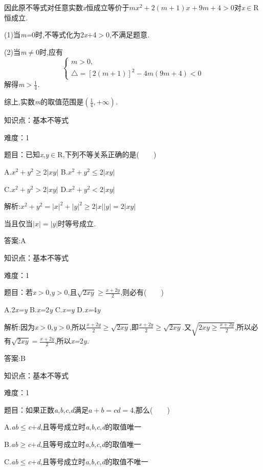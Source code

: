\documentclass{article} %
\begin{document}
因此原不等式对任意实数\textit{x}恒成立等价于$mx^2+2(m+1)x+9m+4>0$对\textit{x}$\mathrm{\in}$R恒成立\textit{.}

(1)当\textit{m=}0时,不等式化为2\textit{x$+$}4\textit{$>$}0,不满足题意\textit{.}

(2)当\textit{m}$\mathrm{\neq}$0时,应有
\[
\begin{cases}
m>0,\\
\bigtriangleup = {[2(m+1)]}^2-4m(9m+4)<0
\end{cases}
\]
解得\textit{m$>\frac{1}{4}$}\textit{.}

综上,实数\textit{m}的取值范围是$(\frac{1}{4},+\infty)$\textit{.}


知识点：基本不等式

难度：1

 题目：已知\textit{x},\textit{y}$\mathrm{\in}$R,下列不等关系正确的是(\textit{　　})

 

 A.$x^2+y^2 \ge 2 |xy|$ B.$x^2+y^2 \le 2 |xy|$

 C.$x^2+y^2 > 2 |xy|$ D.$x^2+y^2 < 2 |xy|$

 解析:$x^2+y^2={|x|}^2+{|y|}^2 \ge 2 |x||y|=2|xy|$

当且仅当$|x|=|y|$时等号成立\textit{.}

 答案:A

知识点：基本不等式

难度：1

 
题目：若\textit{x$>$}0,\textit{y$>$}0,且$\sqrt{2xy} \ge \frac{x+2y}{2}$,则必有(\textit{　　})

 A.2\textit{x=y} B.\textit{x=}2\textit{y} C.\textit{x=y} D.\textit{x=}4\textit{y}

 解析:因为\textit{x$>$}0,\textit{y$>$}0,所以$\frac{x+2y}{2}\ge \sqrt{2xy}$,即$\frac{x+2y}{2}\ge \sqrt{2xy}$\textit{.}又$\sqrt{2xy\ge\frac{x+2y}{2}}$,所以必有$\sqrt{2xy}=\frac{x+2y}{2}$,所以\textit{x=}2\textit{y.}

 答案:B

知识点：基本不等式

难度：1

 题目：如果正数\textit{a},\textit{b},\textit{c},\textit{d}满足\textit{$a+b=cd=$}4,那么(\textit{　　})

 A.\textit{ab}$\mathrm{\le}$\textit{c$+$d},且等号成立时\textit{a},\textit{b},\textit{c},\textit{d}的取值唯一

 B.\textit{ab}$\mathrm{\ge}$\textit{c$+$d},且等号成立时\textit{a},\textit{b},\textit{c},\textit{d}的取值唯一

 C.\textit{ab}$\mathrm{\le}$\textit{c$+$d},且等号成立时\textit{a},\textit{b},\textit{c},\textit{d}的取值不唯一
\end{document}
